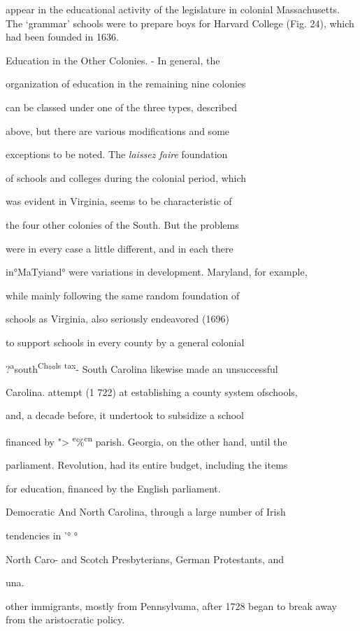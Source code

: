 \documentclass[
]{book}
\begin{document}
appear in the educational activity of the legislature in colonial Massachusetts. The `grammar' schools were to prepare boys for Harvard College (Fig. 24), which had been founded in 1636.

Education in the Other Colonies. - In general, the

organization of education in the remaining nine colonies

can be classed under one of the three types, described

above, but there are various modifications and some

exceptions to be noted. The \emph{laissez faire} foundation

of schools and colleges during the colonial period, which

was evident in Virginia, seems to be characteristic of

the four other colonies of the South. But the problems

were in every case a little different, and in each there

in°MaTyiand° were variations in development. Maryland, for example,

while mainly following the same random foundation of

schools as Virginia, also seriously endeavored (1696)

to support schools in every county by a general colonial

?\textsuperscript{a}south\textsuperscript{Ch}°°\textsuperscript{ls} \textsuperscript{tax}- South Carolina likewise made an unsuccessful

Carolina. attempt (1 722) at establishing a county system ofschools,

and, a decade before, it undertook to subsidize a school

financed by "\textgreater{} \textsuperscript{e}\%\textsuperscript{cn} parish. Georgia, on the other hand, until the

parliament. Revolution, had its entire budget, including the items

for education, financed by the English parliament.

Democratic And North Carolina, through a large number of Irish

tendencies in '° °

North Caro- and Scotch Presbyterians, German Protestants, and

una.

other immigrants, mostly from Pennsylvama, after 1728 began to break away from the aristocratic policy.
\end{document}
